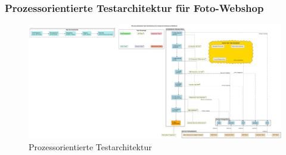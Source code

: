 \clearpage


\subsubsection{Prozessorientierte Testarchitektur für Foto-Webshop}
\begin{figure}[h!]
\centering
    \includegraphics[width=1.1\textwidth]{fig/prozessschritte.png}
    \caption{Prozessorientierte Testarchitektur}
    \label{fig:flow2}
\end{figure}
